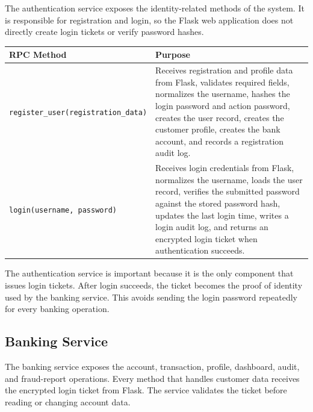 \documentclass[12pt,a4paper]{article}
\newcommand{\subsectionbreakguard}{\Needspace{5\baselineskip}}
\begin{document}
The authentication service exposes the identity-related methods of the system. It is responsible for registration and login, so the Flask web application does not directly create login tickets or verify password hashes.

\begingroup
\small
\setlength{\tabcolsep}{4pt}
\begin{longtable}{|p{5.7cm}|p{8.3cm}|}
\hline
\textbf{RPC Method} & \textbf{Purpose} \\
\hline
\texttt{register\_user}\newline\texttt{(registration\_data)} & Receives registration and profile data from Flask, validates required fields, normalizes the username, hashes the login password and action password, creates the user record, creates the customer profile, creates the bank account, and records a registration audit log. \\
\hline
\texttt{login(username, password)} & Receives login credentials from Flask, normalizes the username, loads the user record, verifies the submitted password against the stored password hash, updates the last login time, writes a login audit log, and returns an encrypted login ticket when authentication succeeds. \\
\hline
\end{longtable}
\endgroup

The authentication service is important because it is the only component that issues login tickets. After login succeeds, the ticket becomes the proof of identity used by the banking service. This avoids sending the login password repeatedly for every banking operation.

\subsectionbreakguard
\subsection{Banking Service}

The banking service exposes the account, transaction, profile, dashboard, audit, and fraud-report operations. Every method that handles customer data receives the encrypted login ticket from Flask. The service validates the ticket before reading or changing account data.
\end{document}
